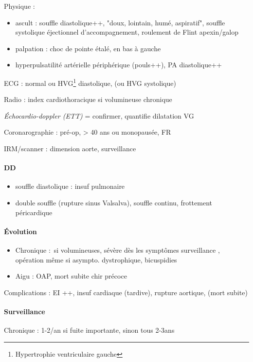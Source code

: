 Physique : 
\begin{itemize}
  \item ascult : souffle diastolique++, "doux, lointain, humé, aspiratif",
    souffle systolique éjectionnel d'accompagnement, roulement de Flint
    apexin/galop
  \item palpation : choc de pointe étalé, en bas à gauche
  \item hyperpulsatilité artérielle périphérique (pouls++), \dec PA
    diastolique++
\end{itemize}

ECG : normal ou HVG\footnote{Hypertrophie ventriculaire gauche} diastolique, (ou
HVG systolique)

Radio : \inc index cardiothoracique si volumineuse chronique

\textit{Échocardio-doppler (ETT)} = confirmer, quantifie dilatation VG 

Coronarographie : pré-op, \male > 40 ans ou \female monopausée, FR

IRM/scanner : dimension aorte, surveillance

\paragraph{DD} 
\begin{itemize}
  \item souffle diastolique : insuf pulmonaire
  \item double souffle (rupture sinus Valsalva), souffle continu, frottement
    péricardique
\end{itemize}
\paragraph{Évolution}
\begin{itemize}
  \item Chronique : si volumineuses, sévère dès les symptômes \thus surveillance
\danger, opération même si asympto. \danger dystrophique, bicuspidies
  \item Aigu : OAP, mort subite \thus chir précoce
\end{itemize}
Complications : EI ++, insuf cardiaque (tardive), rupture aortique, (mort subite)
   
\paragraph{Surveillance} 
Chronique : 1-2/an si fuite importante, sinon tous 2-3ans

